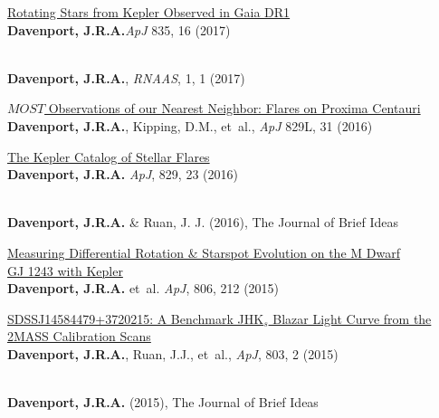 \documentclass{article}
\begin{document}
\begin{llist}
\begin{etaremune}[leftmargin=10pt]

\item{\sc \href{https://arxiv.org/abs/1610.08563}{\color{blue} Rotating Stars from Kepler Observed in Gaia DR1}}\\
{\bf Davenport, J.R.A.}{\em ApJ} 835, 16 (2017)

\item{\href{http://adsabs.harvard.edu/abs/2017arXiv171009468D}{\color{blue}{\sc Infrared Flares from M Dwarfs: a Hinderance to Future Transiting Exoplanet Studies}}}\\
{\bf Davenport, J.R.A.}, {\em RNAAS}, 1, 1 (2017)


\item{\sc \href{http://arxiv.org/abs/1608.06672}{\color{blue} $MOST$ Observations of our Nearest Neighbor: Flares on Proxima Centauri}}\\
{\bf Davenport, J.R.A.}, Kipping, D.M., et~al., {\em ApJ} 829L, 31 (2016)

\item{\sc \href{http://adsabs.harvard.edu/abs/2016ApJ...829...23D}{\color{blue}The Kepler Catalog of Stellar Flares}}\\
{\bf Davenport, J.R.A.} {\em ApJ}, 829, 23 (2016)

\item\href{http://dx.doi.org/10.5281/zenodo.60308}{\color{blue}{\sc Searching for ``Tabby's Star'' Analogs in Stripe 82}}\\
{\bf Davenport, J.R.A.} \& Ruan, J. J. (2016), The Journal of Brief Ideas


\item{\sc \href{http://arxiv.org/abs/1505.01524}{\color{blue} Measuring Differential Rotation \& Starspot Evolution on the M Dwarf \\GJ 1243 with Kepler}}\\
{\bf Davenport, J.R.A.} et~al. {\em ApJ}, 806, 212 (2015)

\item{\sc \href{http://adsabs.harvard.edu/abs/2015ApJ...803....2D}{\color{blue}SDSSJ14584479+3720215: A Benchmark JHK$_s$ Blazar Light Curve from the\\ 2MASS Calibration Scans}}\\
{\bf Davenport, J.R.A.}, Ruan, J.J., et~al., {\em ApJ}, 803, 2 (2015)

\item\href{http://dx.doi.org/10.5281/zenodo.14841}{\color{blue}{\sc The Galactic Astigmatism: Constraining the Milky Way Dark Matter Halo\\ Using Ultra-Weak Lensing}}\\
{\bf Davenport, J.R.A.} (2015), The Journal of Brief Ideas


\end{etaremune}
\end{llist}
\end{document}

